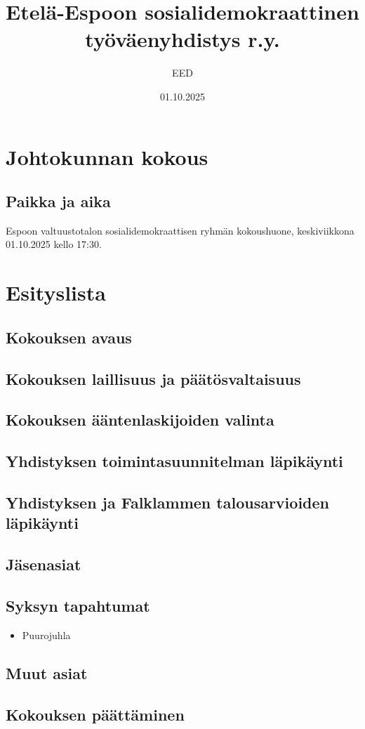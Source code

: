 \documentclass[a4paper,12pt]{article}
\title{Etelä-Espoon sosialidemokraattinen työväenyhdistys r.y.}
\author{EED}
\date{01.10.2025}
\begin{document}
\maketitle
\tableofcontents
\section*{Johtokunnan kokous}
\subsection*{Paikka ja aika}
Espoon valtuustotalon sosialidemokraattisen ryhmän kokoushuone, keskiviikkona 01.10.2025 kello 17:30.
\section*{Esityslista}
\subsection{Kokouksen avaus}
\subsection{Kokouksen laillisuus ja päätösvaltaisuus}
\subsection{Kokouksen ääntenlaskijoiden valinta}
\subsection{Yhdistyksen toimintasuunnitelman läpikäynti}
\subsection{Yhdistyksen ja Falklammen talousarvioiden läpikäynti}
\subsection{Jäsenasiat}
\subsection{Syksyn tapahtumat}
\begin{itemize}
\item{Puurojuhla}
\end{itemize}
\subsection{Muut asiat}
\subsection{Kokouksen päättäminen}
\end{document}
